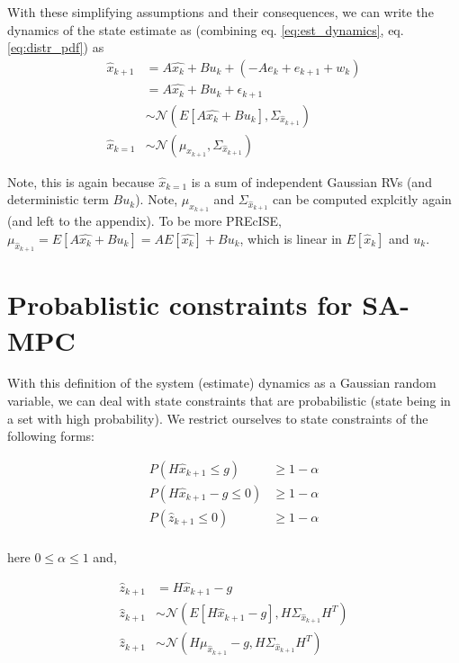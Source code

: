 \documentclass{article}[14pt]
\begin{document}
	With these simplifying assumptions and their consequences, we can write the dynamics of the state estimate as (combining eq. \ref{eq:est_dynamics}, eq. \ref{eq:distr_pdf}) as
	\begin{subequations}
		\begin{align}
			\hat{x}_{k+1} &= A\hat{x_k}+ Bu_k + (-Ae_{k}+e_{k+1}+w_k) \nonumber \\
									 &= A\hat{x_k}+ Bu_k + \epsilon_{k+1} \nonumber \\
							   &\sim \mathcal{N}(E[A\hat{x_k}+Bu_k], \Sigma_{\hat{x}_{k+1}}) \nonumber \\
			\hat{x}_{k=1} &\sim \mathcal{N}(\mu_{x_{k+1}}, \Sigma_{\hat{x}_{k+1}})						
		\end{align}
	\end{subequations}

	Note, this is again because $\hat{x}_{k=1}$ is a sum of independent Gaussian RVs (and deterministic term $Bu_k$). Note, $\mu_{x_{k+1}}$ and $\Sigma_{\hat{x}_{k+1}}$ can be computed explcitly again (and left to the appendix). To be more PREcISE, $\mu_{\hat{x}_{k+1}} = E[A\hat{x_k}+Bu_k] = AE[\hat{x_k}]+Bu_k$, which is linear in $E[\hat{x}_k]$ and $u_k$.

	\section{Probablistic constraints for SA-MPC}
	With this definition of the system (estimate) dynamics as a Gaussian random variable, we can deal with state constraints that are probabilistic (state being in a set with high probability). We restrict ourselves to state constraints of the following forms:

	\begin{subequations}
		\begin{align}
			P(H\hat{x}_{k+1}\leq g ) &\geq 1-\alpha \nonumber \\
			P(H\hat{x}_{k+1}-g\leq 0) &\geq 1-\alpha \nonumber \\
			P(\hat{z}_{k+1}\leq0) &\geq 1-\alpha \nonumber \\
		\end{align}
		\label{eq:constraint_form}	
	\end{subequations}

	here $0\leq\alpha\leq1$ and, 

	\begin{subequations}
		\begin{align}
			\hat{z}_{k+1} &= H\hat{x}_{k+1}-g \nonumber \\
			\hat{z}_{k+1} &\sim \mathcal{N}(E[H\hat{x}_{k+1}-g],H\Sigma_{\hat{x}_{k+1}}H^{T}) \nonumber \\
			\hat{z}_{k+1} &\sim \mathcal{N}(H\mu_{\hat{x}_{k+1}}-g,H\Sigma_{\hat{x}_{k+1}}H^{T})
		\end{align}
		\label{eq:pdf_constraint}
	\end{subequations}
\end{document}
